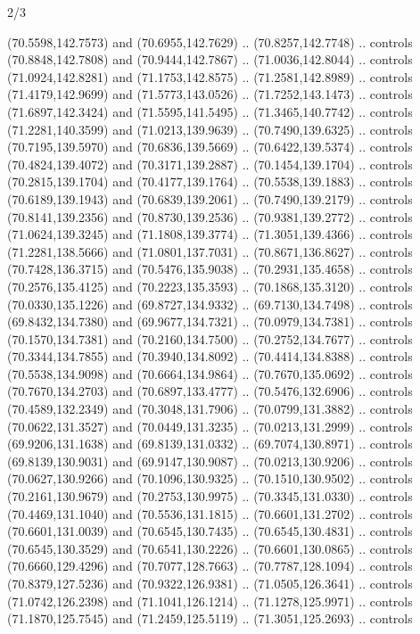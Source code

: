 \begin{flagdescription}{2/3}
\begin{scope}[shift={(0.5\flaglength,0.5)},scale=\flagwidth/320]
\begin{scope}[y=0.8pt, x=0.8pt, yscale=-1,shift={(-118.3,-146)}]
  (70.5598,142.7573) and (70.6955,142.7629) .. (70.8257,142.7748) .. controls
  (70.8848,142.7808) and (70.9444,142.7867) .. (71.0036,142.8044) .. controls
  (71.0924,142.8281) and (71.1753,142.8575) .. (71.2581,142.8989) .. controls
  (71.4179,142.9699) and (71.5773,143.0526) .. (71.7252,143.1473) .. controls
  (71.6897,142.3424) and (71.5595,141.5495) .. (71.3465,140.7742) .. controls
  (71.2281,140.3599) and (71.0213,139.9639) .. (70.7490,139.6325) .. controls
  (70.7195,139.5970) and (70.6836,139.5669) .. (70.6422,139.5374) .. controls
  (70.4824,139.4072) and (70.3171,139.2887) .. (70.1454,139.1704) .. controls
  (70.2815,139.1704) and (70.4177,139.1764) .. (70.5538,139.1883) .. controls
  (70.6189,139.1943) and (70.6839,139.2061) .. (70.7490,139.2179) .. controls
  (70.8141,139.2356) and (70.8730,139.2536) .. (70.9381,139.2772) .. controls
  (71.0624,139.3245) and (71.1808,139.3774) .. (71.3051,139.4366) .. controls
  (71.2281,138.5666) and (71.0801,137.7031) .. (70.8671,136.8627) .. controls
  (70.7428,136.3715) and (70.5476,135.9038) .. (70.2931,135.4658) .. controls
  (70.2576,135.4125) and (70.2223,135.3593) .. (70.1868,135.3120) .. controls
  (70.0330,135.1226) and (69.8727,134.9332) .. (69.7130,134.7498) .. controls
  (69.8432,134.7380) and (69.9677,134.7321) .. (70.0979,134.7381) .. controls
  (70.1570,134.7381) and (70.2160,134.7500) .. (70.2752,134.7677) .. controls
  (70.3344,134.7855) and (70.3940,134.8092) .. (70.4414,134.8388) .. controls
  (70.5538,134.9098) and (70.6664,134.9864) .. (70.7670,135.0692) .. controls
  (70.7670,134.2703) and (70.6897,133.4777) .. (70.5476,132.6906) .. controls
  (70.4589,132.2349) and (70.3048,131.7906) .. (70.0799,131.3882) .. controls
  (70.0622,131.3527) and (70.0449,131.3235) .. (70.0213,131.2999) .. controls
  (69.9206,131.1638) and (69.8139,131.0332) .. (69.7074,130.8971) .. controls
  (69.8139,130.9031) and (69.9147,130.9087) .. (70.0213,130.9206) .. controls
  (70.0627,130.9266) and (70.1096,130.9325) .. (70.1510,130.9502) .. controls
  (70.2161,130.9679) and (70.2753,130.9975) .. (70.3345,131.0330) .. controls
  (70.4469,131.1040) and (70.5536,131.1815) .. (70.6601,131.2702) .. controls
  (70.6601,131.0039) and (70.6545,130.7435) .. (70.6545,130.4831) .. controls
  (70.6545,130.3529) and (70.6541,130.2226) .. (70.6601,130.0865) .. controls
  (70.6660,129.4296) and (70.7077,128.7663) .. (70.7787,128.1094) .. controls
  (70.8379,127.5236) and (70.9322,126.9381) .. (71.0505,126.3641) .. controls
  (71.0742,126.2398) and (71.1041,126.1214) .. (71.1278,125.9971) .. controls
  (71.1870,125.7545) and (71.2459,125.5119) .. (71.3051,125.2693) .. controls

\end{scope}
\end{scope}
\end{flagdescription}
